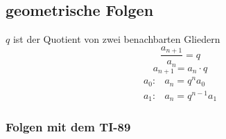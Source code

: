 \subsection{geometrische Folgen}
$q$ ist der Quotient von zwei benachbarten Gliedern\\
\[ \boxed{\frac{a_{n+1}}{a_n} = q} \]
\[ \boxed{a_{n+1} = a_n \cdot q} \]
\[ \boxed{\begin{array}{ll}
a_0 :& a_n = q^{n} a_0\\
a_1 :& a_n = q^{n-1} a_1
\end{array}} \]

\ifti
\subsubsection{Folgen mit dem TI-89}
